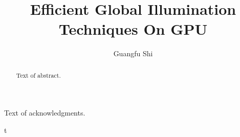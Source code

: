 \documentclass[12pt]{report}
\author{Guangfu Shi}
\title{Efficient Global Illumination Techniques On GPU}
\begin{document}
\begin{abstract}
  Text of abstract.  
\end{abstract}

\begin{acknowledgments}
  Text of acknowledgments.
\end{acknowledgments}


\setcounter{page}{1}t
	








	

		

%				

%                        
%
\end{document}
